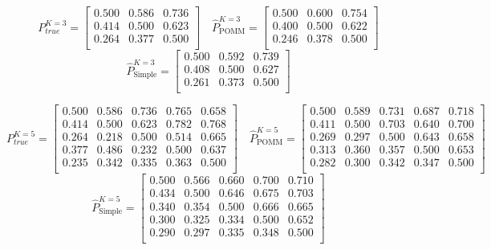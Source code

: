 \documentclass[11pt]{amsart}
\begin{document}
\newpage
\[
P^{K=3}_{true} = 
\left[\begin{array}{ccc}
0.500 & 0.586 & 0.736 \\
0.414 & 0.500 & 0.623 \\
0.264 & 0.377 & 0.500 \\
\end{array}\right] \quad 
\hat{P}^{K=3}_{\text{POMM}} = 
\left[\begin{array}{ccc}
0.500 & 0.600 & 0.754 \\
0.400 & 0.500 & 0.622 \\
0.246 & 0.378 & 0.500 \\
\end{array}\right] 
\]
\[ 
\hat{P}^{K=3}_{\text{Simple}} = 
\left[\begin{array}{ccc}
0.500 & 0.592 & 0.739 \\
0.408 & 0.500 & 0.627 \\
0.261 & 0.373 & 0.500 \\ 
\end{array}\right]
\]

\[
P^{K=5}_{true} = 
\left[\begin{array}{ccccc}
0.500 & 0.586 & 0.736 & 0.765 & 0.658 \\
0.414 & 0.500 & 0.623 & 0.782 & 0.768 \\
0.264 & 0.218 & 0.500 & 0.514 & 0.665 \\
0.377 & 0.486 & 0.232 & 0.500 & 0.637 \\
0.235 & 0.342 & 0.335 & 0.363 & 0.500 \\
\end{array}\right] \quad 
\hat{P}^{K=5}_{\text{POMM}} = 
\left[\begin{array}{ccccc}
0.500 & 0.589 & 0.731 & 0.687 & 0.718 \\
0.411 & 0.500 & 0.703 & 0.640 & 0.700 \\
0.269 & 0.297 & 0.500 & 0.643 & 0.658 \\
0.313 & 0.360 & 0.357 & 0.500 & 0.653 \\
0.282 & 0.300 & 0.342 & 0.347 & 0.500 \\
\end{array}\right] 
\]
\[ 
\hat{P}^{K=5}_{\text{Simple}} = 
\left[\begin{array}{ccccc}
0.500 & 0.566 & 0.660 & 0.700 & 0.710 \\
0.434 & 0.500 & 0.646 & 0.675 & 0.703 \\
0.340 & 0.354 & 0.500 & 0.666 & 0.665 \\
0.300 & 0.325 & 0.334 & 0.500 & 0.652 \\
0.290 & 0.297 & 0.335 & 0.348 & 0.500 \\
\end{array}\right]
\]
\end{document}
